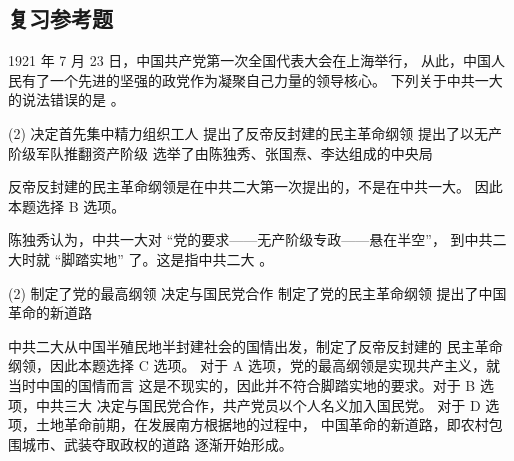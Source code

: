 \documentclass[10pt, UTF8]{book} %
\begin{document}
\subsection{复习参考题}

\begin{example}
    1921 年 7 月 23 日，中国共产党第一次全国代表大会在上海举行，
    从此，中国人民有了一个先进的坚强的政党作为凝聚自己力量的领导核心。
    下列关于中共一大的说法错误的是 \underline{\qquad \qquad \qquad}。
    \begin{tasks}[label={\Alph*.}](2)
        \task 决定首先集中精力组织工人
        \task 提出了反帝反封建的民主革命纲领
        \task 提出了以无产阶级军队推翻资产阶级
        \task 选举了由陈独秀、张国焘、李达组成的中央局
    \end{tasks}
    \begin{cmt}
        反帝反封建的民主革命纲领是在中共二大第一次提出的，不是在中共一大。
        因此本题选择 B 选项。
    \end{cmt}
\end{example}

\begin{example}
    陈独秀认为，中共一大对 “党的要求——无产阶级专政——悬在半空”，
    到中共二大时就 “脚踏实地” 了。这是指中共二大 \underline{\qquad \qquad \qquad}。
    \begin{tasks}[label={\Alph*.}](2)
        \task 制定了党的最高纲领
        \task 决定与国民党合作
        \task 制定了党的民主革命纲领
        \task 提出了中国革命的新道路
    \end{tasks}
    \begin{cmt}
        中共二大从中国半殖民地半封建社会的国情出发，制定了反帝反封建的
        民主革命纲领，因此本题选择 C 选项。
        对于 A 选项，党的最高纲领是实现共产主义，就当时中国的国情而言
        这是不现实的，因此并不符合脚踏实地的要求。对于 B 选项，中共三大
        决定与国民党合作，共产党员以个人名义加入国民党。
        对于 D 选项，土地革命前期，在发展南方根据地的过程中，
        中国革命的新道路，即农村包围城市、武装夺取政权的道路
        逐渐开始形成。
    \end{cmt}
\end{example}
\end{document}
